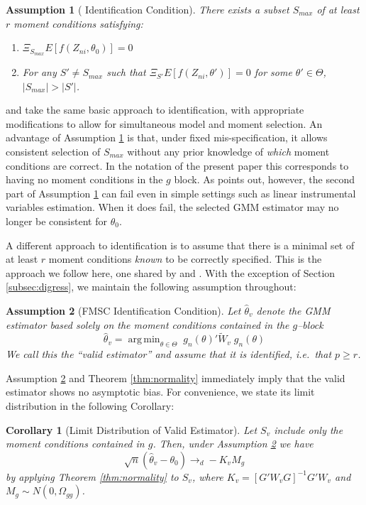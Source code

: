 \documentclass[12pt]{article}
\DeclareMathOperator*{\argmin}{arg\,min}
\newtheorem{assump}{Assumption}[section]
\newtheorem{cor}{Corollary}[section]
\theoremstyle{definition}
\begin{document}
\begin{assump}[\cite{Andrews1999} Identification Condition]
	\label{assump:Andrews}
There exists a subset $S_{max}$ of at least $r$ moment conditions satisfying:
	\begin{enumerate}
	 	\item $\Xi_{S_{max}} E[f(Z_{ni},\theta_0)]= 0$
	 	\item For any $S' \neq S_{max}$ such that $\Xi_{S'} E[f(Z_{ni},\theta')]= 0$ for some $\theta' \in \Theta$, $|S_{max}| > |S'|$.
	 \end{enumerate}
\end{assump}

\cite{AndrewsLu} and \cite{HongPrestonShum} take the same basic approach to identification, with appropriate modifications to allow for simultaneous model and moment selection. An advantage of Assumption \ref{assump:Andrews} is that, under fixed mis-specification, it allows consistent selection of $S_{max}$ without any prior knowledge of \emph{which} moment conditions are correct. In the notation of the present paper this corresponds to having no moment conditions in the $g$ block. As \citet[p.\ 254]{Hallbook} points out, however, the second part of Assumption \ref{assump:Andrews} can fail even in simple settings such as linear instrumental variables estimation. When it does fail, the selected GMM estimator may no longer be consistent for $\theta_0$. 

A different approach to identification is to assume that there is a minimal set of at least $r$ moment conditions \emph{known} to be correctly specified. This is the approach we follow here, one shared by \cite{Liao} and \cite{ChengLiao}. With the exception of Section \ref{subsec:digress}, we maintain the following assumption throughout: 

\begin{assump}[FMSC Identification Condition] 
\label{assump:Identification}
Let $\widehat{\theta}_v$ denote the GMM estimator based solely on the moment conditions contained in the $g$--block
$$\widehat{\theta}_v = \argmin_{\theta \in \Theta}\; g_n(\theta)' \widetilde{W}_{v} \; g_n(\theta)$$
We call this the ``valid estimator'' and assume that it is identified, i.e.\ that $p\geq r$.
\end{assump}

Assumption \ref{assump:Identification} and Theorem \ref{thm:normality} immediately imply that the valid estimator shows no asymptotic bias. For convenience, we state its limit distribution in the following Corollary: 
\begin{cor}[Limit Distribution of Valid Estimator]
	\label{cor:valid}
	Let $S_{v}$ include only the moment conditions contained in $g$. Then, under Assumption \ref{assump:Identification} we have
		$$\sqrt{n}\left(\widehat{\theta}_v - \theta_0\right) \rightarrow_d -K_v M_g$$
	by applying Theorem \ref{thm:normality} to $S_{v}$, where $K_v = [G'W_vG]^{-1}G'W_v$ and $M_g \sim N(0,\Omega_{gg})$. 
\end{cor}
\end{document}
